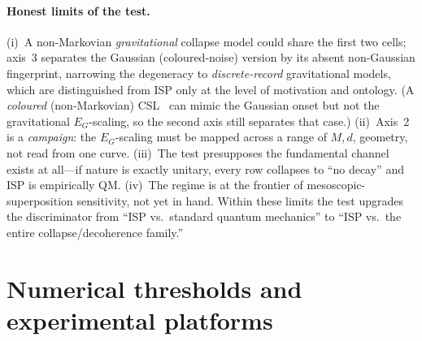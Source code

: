 \documentclass[aps,prd,onecolumn,amsmath,amssymb,nofootinbib,superscriptaddress]{revtex4-2}
\begin{document}
\paragraph{Honest limits of the test.} (i)~A non-Markovian \emph{gravitational} collapse
model could share the first two cells; axis~3 separates the Gaussian (coloured-noise) version by its
absent non-Gaussian fingerprint, narrowing the degeneracy to \emph{discrete-record} gravitational
models, which are distinguished from ISP only at the level of motivation and ontology. (A \emph{coloured}
(non-Markovian) CSL~\cite{R10} can mimic the Gaussian onset but not the gravitational $E_G$-scaling,
so the second axis still separates that case.) (ii)~Axis~2 is a \emph{campaign}: the $E_G$-scaling
must be mapped across a range of $M,d$, geometry, not read from one curve. (iii)~The test
presupposes the fundamental channel exists at all---if nature is exactly unitary, every row collapses
to ``no decay'' and ISP is empirically QM. (iv)~The regime is at the frontier of
mesoscopic-superposition sensitivity, not yet in hand. Within these limits the test upgrades
the discriminator from ``ISP vs.\ standard quantum mechanics'' to ``ISP vs.\ the entire
collapse/decoherence family.''

\section{Numerical thresholds and experimental platforms}\label{sec:thresholds}
\end{document}
